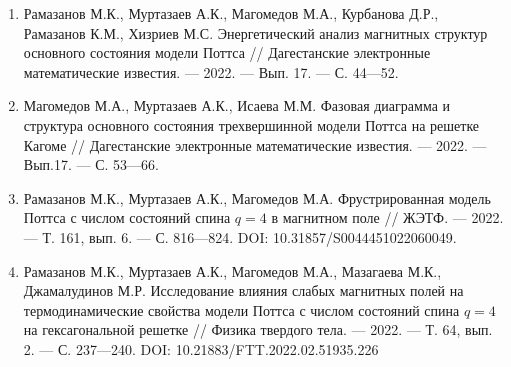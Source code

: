 \begin{enumerate}[1]
    \item
    Рамазанов М.К., Муртазаев А.К., Магомедов М.А., Курбанова Д.Р., Рамазанов К.М., Хизриев М.С.
    Энергетический анализ магнитных структур основного состояния модели Поттса
    //
    Дагестанские электронные математические известия.
    --- 2022.
    --- Вып. 17.
    --- С. 44---52.

    \item
    Магомедов М.А., Муртазаев А.К., Исаева М.М.
    Фазовая диаграмма и структура основного состояния трехвершинной модели Поттса на решетке Кагоме
    //
    Дагестанские электронные математические известия.
    --- 2022.
    --- Вып.17.
    --- С. 53---66.

    \item
    Рамазанов М.К., Муртазаев А.К., Магомедов М.А.
    Фрустрированная модель Поттса с числом состояний спина $q = 4$ в магнитном поле
    //
    ЖЭТФ.
    --- 2022.
    --- Т. 161, вып. 6.
    --- С. 816---824. DOI: 10.31857/S0044451022060049.

    \item
    Рамазанов М.К., Муртазаев А.К., Магомедов М.А., Мазагаева М.К., Джамалудинов М.Р.
    Исследование влияния слабых магнитных полей на термодинамические свойства модели Поттса с числом состояний спина $q = 4$ на гексагональной решетке
    //
    Физика твердого тела.
    --- 2022.
    --- Т. 64, вып. 2.
    --- С. 237---240. DOI: 10.21883/FTT.2022.02.51935.226


%
%

\end{enumerate}




